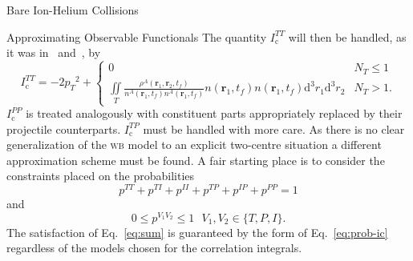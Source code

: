 \documentclass[letterpaper, 11 pt]{report}
\begin{document}
\begin{chapter}{Bare Ion-Helium Collisions \label{chap:p-he2p-he}}
\begin{section}{Approximating Observable Functionals \label{sec:phe2p-obs}}
      The quantity $I_\mathrm{c}^{TT}$ will then be handled, as it was in~\cite{thesis}
      and~\cite{pbarhe}, by
      \begin{equation} \label{eq:wbExplicit}
         I_\mathrm{c}^{TT} = - 2 {p_T}^2 +
         \begin{cases}
            0 & N_T \leq 1 \\
            \iint\limits_T \frac{\rho^A(\mathbf{r}_1, \mathbf{r}_2,t_f)}
                    {n^{A}(\mathbf{r}_1,t_f) n^{A}(\mathbf{r}_1,t_f)}
                    n(\mathbf{r}_1,t_f) n(\mathbf{r}_1,t_f) \mathrm{d}^3 r_1 \mathrm{d}^3 r_2
            & N_T > 1.
         \end{cases}
      \end{equation}
      $I_\mathrm{c}^{PP}$ is treated analogously with constituent parts appropriately replaced by their
      projectile counterparts. $I_\mathrm{c}^{TP}$ must be handled with more care. As there is no clear
      generalization of the \textsc{wb} model to an explicit two-centre situation a different
      approximation scheme must be found. A fair starting place is to consider the constraints placed on
      the probabilities
      \begin{equation} \label{eq:sum}
         p^{TT} + p^{TI} + p^{II} + p^{TP} + p^{IP} + p^{PP} = 1
      \end{equation}
      and
      \begin{equation} \label{eq:bound}
         0 \leq p^{V_1 V_2} \leq 1 ~ ~ ~ V_1, V_2 \in\{ T,P,I\}.
      \end{equation}
      The satisfaction of Eq.~\eqref{eq:sum} is guaranteed by the form of Eq.~\eqref{eq:prob-ic}
      regardless of the models chosen for the correlation integrals.


\end{section}
\end{chapter}
\end{document}
